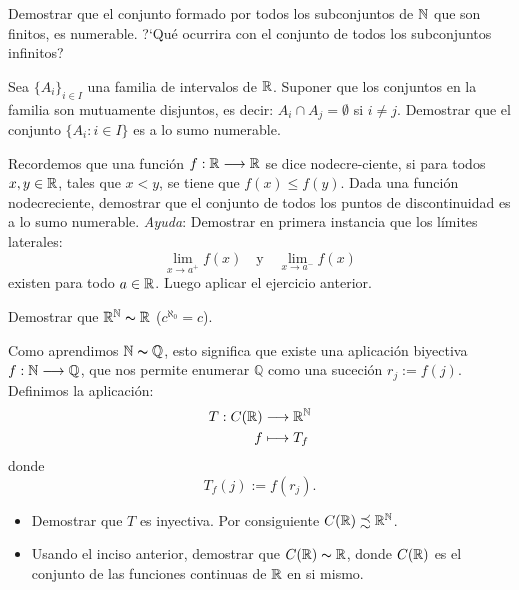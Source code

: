 \begin{ejercicio}{} Demostrar que el conjunto formado por todos los
subconjuntos de $\mathbb{N}$ que son finitos, es numerable.
?`Qué ocurrira con el conjunto de todos los subconjuntos
infinitos?
\end{ejercicio}
\begin{ejercicio}{} Sea $\{A_i\}_{i\in I}$ una familia de intervalos
de $\mathbb{R}$. Suponer que los conjuntos en la familia son mutuamente
disjuntos, es decir: $A_i\cap A_j=\emptyset$ si $i\neq j$.
Demostrar que el conjunto $\{A_i:i\in I\}$ es a lo sumo numerable.
\end{ejercicio}
\begin{ejercicio}{} Recordemos que una función
$f:\mathbb{R}\longrightarrow\mathbb{R}$ se dice nodecre-\newline ciente, si para
todos $x,y\in\mathbb{R}$, tales que $x<y$, se tiene que $f(x)\leq f(y)$.
Dada una función nodecreciente, demostrar que el conjunto de
todos los puntos de discontinuidad es a lo sumo numerable.
\textit{Ayuda}: Demostrar en primera instancia que los
límites laterales:
\[
    \lim\limits_{x\rightarrow a^+}f(x)\quad\text{y}\quad \lim\limits_{x\rightarrow
    a^-}f(x)
\]
existen para todo $a\in\mathbb{R}$. Luego aplicar el ejercicio anterior.
\end{ejercicio}
\begin{ejercicio}{} Demostrar que $\mathbb{R}^{\mathbb{N}}\thicksim\mathbb{R}$ ($c^{\aleph_0}=c$).
\end{ejercicio}
\begin{ejercicio}{} Como aprendimos $\mathbb{N}\thicksim\mathbb{Q}$, esto
significa que existe una aplicación biyectiva
$f:\mathbb{N}\longrightarrow\mathbb{Q}$, que nos permite enumerar
$\mathbb{Q}$ como una suceción $r_j:=f(j)$. Definimos la
aplicación:
\[\begin{split}
              T:C(\mathbb{R})&\longrightarrow \mathbb{R}^{\mathbb{N}}\\
              f        &\longmapsto T_f\\
\end{split}\]
donde
\[
  T_f(j):=f(r_j).
\]
\begin{itemize}
   \item [1.] Demostrar que $T$ es inyectiva. Por consiguiente
   $C(\mathbb{R})\precsim\mathbb{R}^{\mathbb{N}}$.
   \item[2.] Usando el inciso anterior, demostrar que
    $C(\mathbb{R})\thicksim\mathbb{R}$, donde $C(\mathbb{R})$ es el conjunto
    de las funciones continuas de $\mathbb{R}$ en si mismo.
\end{itemize}
\end{ejercicio}
